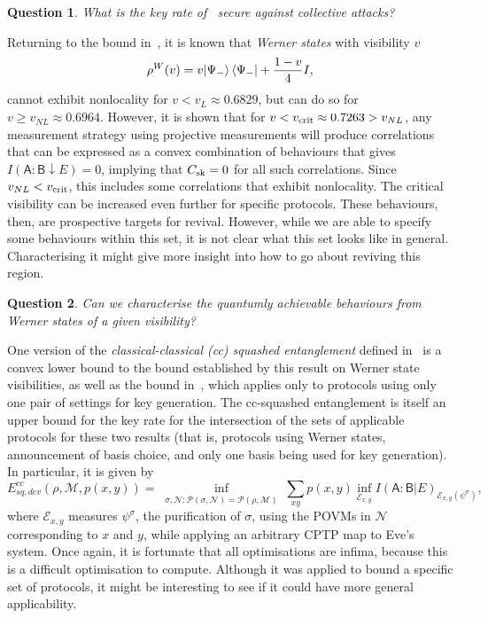 \documentclass[10pt, a4paper]{article}
\numberwithin{equation}{section} %
\theoremstyle{definition}
\theoremstyle{plain}
\newtheorem{question}{Question}
\newcommand{\?}{\mathrel{?}} %
\newcommand{\sM}{\mathcal{M}}
\newcommand{\sN}{\mathcal{N}}
\newcommand{\cE}{\mathcal{E}}
\newcommand{\cP}{\mathcal{P}}
\newcommand{\crv}[1]{\mathsf{#1}}
\newcommand{\sk}{\rm sk}
\newcommand{\crit}{\rm crit}
\begin{document}
      \begin{question}
        What is the key rate of~\cite{NonstandardProtocol} secure against collective attacks?
      \end{question}

      Returning to the bound in~\cite{NotSufficient}, it is known that \emph{Werner states} with visibility \(v\)
      \begin{equation}
        \rho^{W}(v) = v{\ket{\Psi_-}\bra{\Psi_-}} + \frac{1-v}{4}I,
      \end{equation}
      cannot exhibit nonlocality for \(v < v_L \approx 0.6829\), but can do so for \(v \geq v_{NL} \approx 0.6964\). However, it is shown that for \(v < v_{\crit} \approx 0.7263 > v_{NL}\), any measurement strategy using projective measurements will produce correlations that can be expressed as a convex combination of behaviours that gives \(I(\crv{A}:\crv{B} \downarrow E) = 0\), implying that \(C_{\sk} = 0\) for all such correlations. Since \(v_{NL} < v_{\crit}\), this includes some correlations that exhibit nonlocality. The critical visibility can be increased even further for specific protocols. These behaviours, then, are prospective targets for revival. However, while we are able to specify some behaviours within this set, it is not clear what this set looks like in general. Characterising it might give more insight into how to go about reviving this region.

      \begin{question}
        Can we characterise the quantumly achievable behaviours from Werner states of a given visibility?
      \end{question}

      One version of the \emph{classical-classical (cc) squashed entanglement} defined in~\cite{CCSquashedEntangle} is a convex lower bound to the bound established by this result on Werner state visibilities, as well as the bound in~\cite{RevisedPeres}, which applies only to protocols using only one pair of settings for key generation. The cc-squashed entanglement is itself an upper bound for the key rate for the intersection of the sets of applicable protocols for these two results (that is, protocols using Werner states, announcement of basis choice, and only one basis being used for key generation). In particular, it is given by
      \begin{equation}
        E^{cc}_{sq,dev}(\rho, \sM, p(x,y)) = \inf_{\substack{\sigma, \sN : \cP(\sigma, \sN) = \cP(\rho, \sM)}} \sum_{xy} p(x,y) \inf_{\cE_{x,y}} I{(\crv{A} : \crv{B}|E)}_{\cE_{x,y}(\psi^{\sigma})},
      \end{equation}
      where \(\cE_{x,y}\) measures \(\psi^\sigma\), the purification of \({\sigma}\), using the POVMs in \(\sN\) corresponding to \(x\) and \(y\), while applying an arbitrary CPTP map to Eve's system. Once again, it is fortunate that all optimisations are infima, because this is a difficult optimisation to compute. Although it was applied to bound a specific set of protocols, it might be interesting to see if it could have more general applicability.
\end{document}
